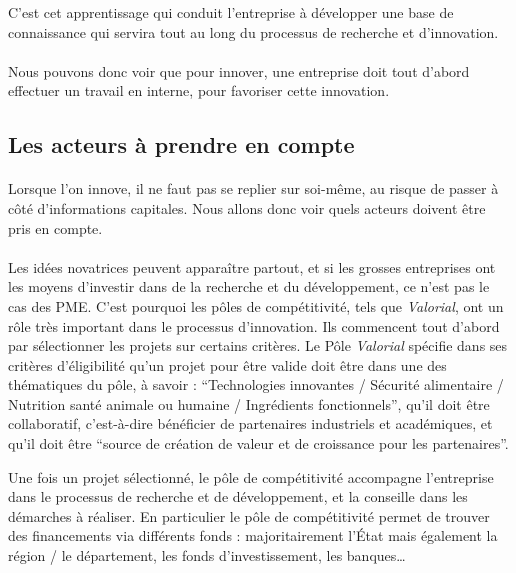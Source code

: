 \documentclass[a4paper,12pt]{report}
\begin{document}
			C’est cet apprentissage qui conduit l’entreprise à développer une base de connaissance qui servira tout au long du processus de recherche et d’innovation.
			
			\paragraph{}Nous pouvons donc voir que pour innover, une entreprise doit tout d'abord effectuer un travail en interne, pour favoriser cette innovation.
			
		\subsection{Les acteurs à prendre en compte}
			\paragraph{}Lorsque l'on innove, il ne faut pas se replier sur soi-même, au risque de passer à côté d'informations capitales. Nous allons donc voir quels acteurs doivent être pris en compte.			
			
			\paragraph{}Les idées novatrices peuvent apparaître partout, et si les grosses entreprises ont les moyens d’investir dans de la recherche et du développement, ce n’est pas le cas des PME. C’est pourquoi les pôles de compétitivité, tels que \textit{Valorial}, ont un rôle très important dans le processus d’innovation. Ils commencent tout d’abord par sélectionner les projets sur certains critères. Le Pôle \textit{Valorial} spécifie dans ses critères d’éligibilité\cite{Eligibilite} qu’un projet pour être valide doit être dans une des thématiques du pôle, à savoir : “Technologies innovantes / Sécurité alimentaire / Nutrition santé animale ou humaine / Ingrédients fonctionnels”, qu’il doit être collaboratif, c’est-à-dire bénéficier de partenaires industriels et académiques, et qu’il doit être “source de création de valeur et de croissance pour les partenaires”.
			
			Une fois un projet sélectionné, le pôle de compétitivité accompagne l’entreprise dans le processus de recherche et de développement, et la conseille dans les démarches à réaliser. En particulier le pôle de compétitivité permet de trouver des financements via différents fonds : majoritairement l’État mais également la région / le département, les fonds d’investissement, les banques…
			
\end{document}

